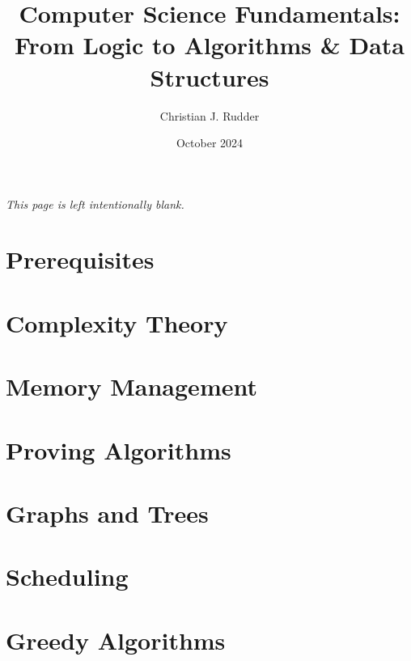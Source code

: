 \documentclass{memoir}
\title{\textbf{Computer Science Fundamentals:}\\
\Large{From Logic to Algorithms \& Data Structures}}
\author{Christian J. Rudder}
\date{October 2024}
\begin{document}
\maketitle
\setcounter{tocdepth}{2}

\tableofcontents

\newpage
\thispagestyle{empty}
\mbox{}
\vfill
\begin{center}
    \textit{This page is left intentionally blank.}
\end{center}
\vfill
\newpage



\chapter*{Prerequisites}


\chapter{Complexity Theory}


\chapter{Memory Management}



\chapter{Proving Algorithms}


\chapter{Graphs and Trees}





\chapter{Scheduling}




\chapter{Greedy Algorithms}


\end{document}

